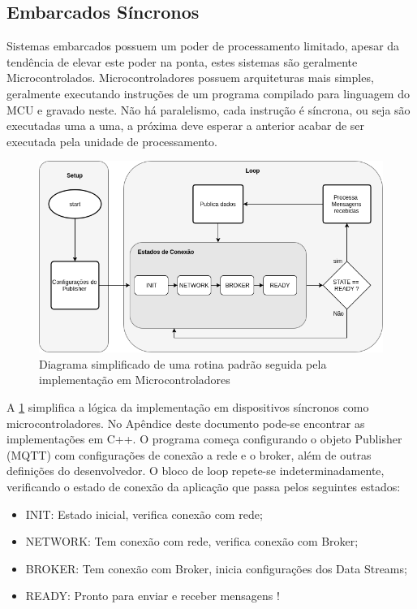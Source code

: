 \subsection{Embarcados Síncronos}
\label{subsection:embarcados_sinc}

Sistemas embarcados possuem um poder de processamento limitado, apesar da tendência de elevar este poder na ponta, estes sistemas são geralmente Microcontrolados. Microcontroladores possuem arquiteturas mais simples, geralmente executando instruções de um programa compilado para linguagem do MCU e gravado neste. Não há paralelismo, cada instrução é síncrona, ou seja são executadas uma a uma, a próxima deve esperar a anterior acabar de ser executada pela unidade de processamento.

\begin{figure}[h!]
\centering
\includegraphics[width=12cm]{./02_Capitulos/02_Cap3/figures/sinc_implementation}
\caption{Diagrama simplificado de uma rotina padrão seguida pela implementação em Microcontroladores}
\label{fig:sinc-implementation}
\end{figure}

A \ref{fig:sinc-implementation} simplifica a lógica da implementação em dispositivos síncronos como microcontroladores. No Apêndice deste documento pode-se encontrar as implementações em C++. O programa começa configurando o objeto Publisher (MQTT) com configurações de conexão a rede e o broker, além de outras definições do desenvolvedor. O bloco de loop repete-se indeterminadamente, verificando o estado de conexão da aplicação que passa pelos seguintes estados:

\begin{itemize}
\item INIT: Estado inicial, verifica conexão com rede;
\item NETWORK: Tem conexão com rede, verifica conexão com Broker;
\item BROKER: Tem conexão com Broker, inicia configurações dos Data Streams;
\item READY: Pronto para enviar e receber mensagens !
\end{itemize}

